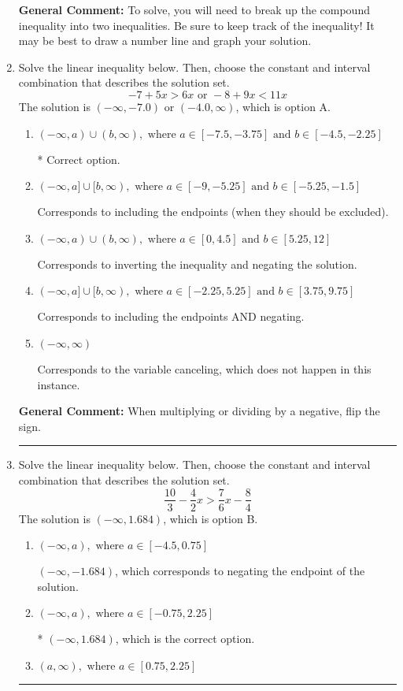 \documentclass{extbook}[14pt]
\newcommand{\litem}[1]{\item #1

\rule{\textwidth}{0.4pt}}
\begin{document}
\begin{enumerate}
{\textbf{General Comment:} To solve, you will need to break up the compound inequality into two inequalities. Be sure to keep track of the inequality! It may be best to draw a number line and graph your solution.
}
\litem{
Solve the linear inequality below. Then, choose the constant and interval combination that describes the solution set.
\[ -7 + 5 x > 6 x \text{ or } -8 + 9 x < 11 x \]The solution is \( (-\infty, -7.0) \text{ or } (-4.0, \infty) \), which is option A.\begin{enumerate}[label=\Alph*.]
\item \( (-\infty, a) \cup (b, \infty), \text{ where } a \in [-7.5, -3.75] \text{ and } b \in [-4.5, -2.25] \)

 * Correct option.
\item \( (-\infty, a] \cup [b, \infty), \text{ where } a \in [-9, -5.25] \text{ and } b \in [-5.25, -1.5] \)

Corresponds to including the endpoints (when they should be excluded).
\item \( (-\infty, a) \cup (b, \infty), \text{ where } a \in [0, 4.5] \text{ and } b \in [5.25, 12] \)

Corresponds to inverting the inequality and negating the solution.
\item \( (-\infty, a] \cup [b, \infty), \text{ where } a \in [-2.25, 5.25] \text{ and } b \in [3.75, 9.75] \)

Corresponds to including the endpoints AND negating.
\item \( (-\infty, \infty) \)

Corresponds to the variable canceling, which does not happen in this instance.
\end{enumerate}

\textbf{General Comment:} When multiplying or dividing by a negative, flip the sign.
}
\litem{
Solve the linear inequality below. Then, choose the constant and interval combination that describes the solution set.
\[ \frac{10}{3} - \frac{4}{2} x > \frac{7}{6} x - \frac{8}{4} \]The solution is \( (-\infty, 1.684) \), which is option B.\begin{enumerate}[label=\Alph*.]
\item \( (-\infty, a), \text{ where } a \in [-4.5, 0.75] \)

 $(-\infty, -1.684)$, which corresponds to negating the endpoint of the solution.
\item \( (-\infty, a), \text{ where } a \in [-0.75, 2.25] \)

* $(-\infty, 1.684)$, which is the correct option.
\item \( (a, \infty), \text{ where } a \in [0.75, 2.25] \)


\end{enumerate}}
\end{enumerate}
\end{document}
